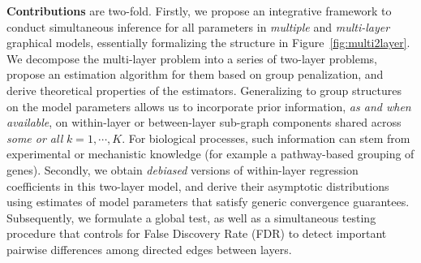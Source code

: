 \noindent
\textbf{Contributions}
are two-fold. Firstly, we propose an integrative framework to conduct simultaneous inference for all parameters in {\it multiple} and {\it multi-layer} graphical models, essentially formalizing the structure in Figure~\ref{fig:multi2layer}. We decompose the multi-layer problem into a series of two-layer problems, propose an estimation algorithm for them based on group penalization, and derive theoretical properties of the estimators. Generalizing to group structures on the model parameters allows us to incorporate prior information, \textit{as and when available}, on within-layer or between-layer sub-graph components shared across \textit{some or all} $k=1,\cdots,K$. For biological processes, such information can stem from experimental or mechanistic knowledge (for example a pathway-based grouping of genes). Secondly, we obtain \textit{debiased} versions of within-layer regression coefficients in this two-layer model, and derive their asymptotic distributions using estimates of model parameters that satisfy generic convergence guarantees. Subsequently, we formulate a global test, as well as a simultaneous testing procedure that controls for False Discovery Rate (FDR) to detect important pairwise differences among directed edges between layers.

